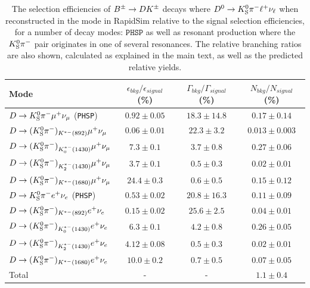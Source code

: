 \begin{table}
    \centering
    \caption{The selection efficiencies of ${{B}^\pm}\rightarrow{\ensuremath{D}}{\ensuremath{{K}^\pm}}$ decays where ${{D}^0}\rightarrow{\ensuremath{{K}^0_{\mathrm{S}}}}{\ensuremath{{\pi}^-}}\ell^+\nu_\ell$ when reconstructed in the \DtoKspipi mode in RapidSim relative to the signal selection efficiencies, for a number of decay modes: $\texttt{PHSP}$ as well as resonant production where the ${{K}^0_{\mathrm{S}}}{{\pi}^-}$ pair originates in one of several \Kstar resonances. The relative branching ratios are also shown, calculated as explained in the main text, as well as the predicted relative yields.
    \label{tab:relative_d2ksellnu_yields}}
    \begin{tabular}{l |cc|c}
    \toprule
    Mode & $\epsilon_{bkg}/\epsilon_{signal}$ (\%)& $\Gamma_{bkg}/\Gamma_{signal}$ (\%)& $N_{bkg}/N_{signal}$ (\%)\\
    \midrule

    ${D}\rightarrow{\ensuremath{{K}^0_{\mathrm{S}}}}{\ensuremath{{\pi}^-}}\mu^+\nu_{\mu}$ (\texttt{PHSP})     & $0.92 \pm 0.05$ & $18.3 \pm 14.8$ & $0.17 \pm 0.14$\\
    ${D}\rightarrow ({{K}^0_{\mathrm{S}}}{{\pi}^-})_{K^{*-}(892)}\mu^+\nu_{\mu}$    & $0.06\pm0.01$ & $22.3\pm 3.2$ & $0.013 \pm 0.003$ \\
    ${D}\rightarrow ({{K}^0_{\mathrm{S}}}{{\pi}^-})_{K^{*-}_0(1430)}\mu^+\nu_{\mu}$ & $7.3 \pm 0.1$ & $3.7 \pm 0.8$ & $0.27 \pm 0.06   $\\
    ${D}\rightarrow ({{K}^0_{\mathrm{S}}}{{\pi}^-})_{K^{*-}_2(1430)}\mu^+\nu_{\mu}$ & $3.7 \pm 0.1$ & $0.5 \pm 0.3$ & $0.02 \pm 0.01$   \\
    ${D}\rightarrow ({{K}^0_{\mathrm{S}}}{{\pi}^-})_{K^{*-}(1680)}\mu^+\nu_{\mu}$   & $24.4 \pm 0.3$ & $0.6 \pm 0.5$ & $0.15 \pm 0.12$\\
    \midrule
    ${D}\rightarrow{\ensuremath{{K}^0_{\mathrm{S}}}}{\ensuremath{{\pi}^-}} e^+\nu_{e}$ (\texttt{PHSP})       & $0.53\pm0.02$ & $20.8\pm16.3$ & $0.11 \pm 0.09$\\
    ${D}\rightarrow ({{K}^0_{\mathrm{S}}}{{\pi}^-})_{K^{*-}(892)} e^+\nu_{e}$      & $0.15\pm0.02$ & $25.6 \pm 2.5$ & $0.04 \pm 0.01$\\
    ${D}\rightarrow ({{K}^0_{\mathrm{S}}}{{\pi}^-})_{K^{*-}_0(1430)} e^+\nu_{e}$   & $6.3 \pm 0.1$ & $4.2\pm0.8$ & $0.26\pm0.05$\\
    ${D}\rightarrow ({{K}^0_{\mathrm{S}}}{{\pi}^-})_{K^{*-}_2(1430)} e^+\nu_{e}$   & $4.12 \pm 0.08$ & $0.5 \pm 0.3$ & $0.02\pm0.01$\\
    ${D}\rightarrow ({{K}^0_{\mathrm{S}}}{{\pi}^-})_{K^{*-}(1680)} e^+\nu_{e}$     & $10.0 \pm 0.2$ & $0.7 \pm 0.5$ & $0.07\pm0.05$\\
    \midrule
    Total & - & - & $1.1\pm0.4$\\
    \bottomrule
    \end{tabular}
\end{table}

